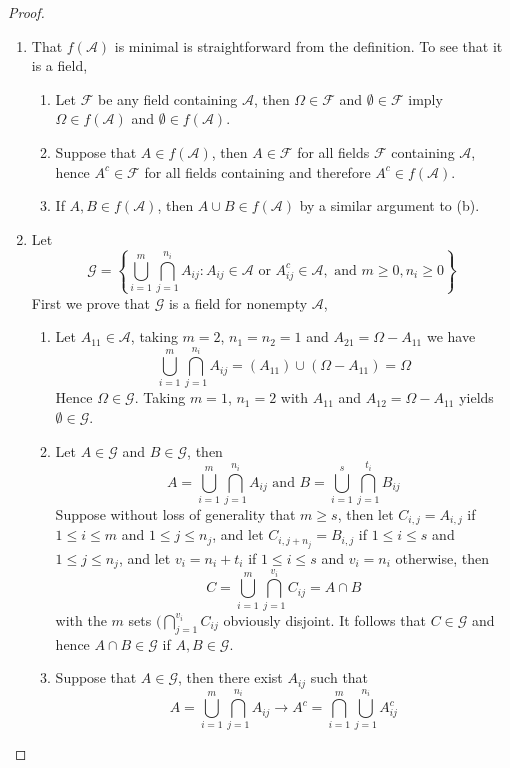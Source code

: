 \documentclass[12pt]{article}
\newcommand{\F}{\mathcal{F}}
\newcommand{\A}{\mathcal{A}}
\newcommand{\G}{\mathcal{G}}
\newcommand{\Om}{\Omega}
\newcommand{\es}{\emptyset}
\newcommand{\un}{\cup}
\newcommand{\ic}{\cap}
\begin{document}
\begin{proof}
    \begin{enumerate}
        \item That $f(\A)$ is minimal is straightforward from the definition. To see that it is a field,
        \begin{enumerate}
            \item Let $\F$ be any field containing $\A$, then $\Om \in \F$ and $\es \in \F$ imply $\Om \in f(\A)$ and $\es \in f(\A)$.
            \item Suppose that $A \in f(\A)$, then $A \in \F$ for all fields $\F$ containing $\A$, hence $A^{c} \in \F$ for all fields containing and therefore $A^{c} \in f(\A)$.
            \item If $A, B \in f(\A)$, then $A \un B \in f(\A)$ by a similar argument to (b).
        \end{enumerate}
        \item Let 
        \[ \G = \left \{ \bigcup_{i=1}^{m} \bigcap_{j=1}^{n_i} A_{ij} : A_{ij} \in \A \text { or } A_{ij}^{c} \in \A, \text { and } m \geq 0, n_i \geq 0 \right \} \]
        First we prove that $\G$ is a field for nonempty $\A$,
        \begin{enumerate}
            \item Let $A_{11} \in \A$, taking $m=2$, $n_1 = n_2 = 1$ and $A_{21} = \Om - A_{11}$ we have
            \[ \bigcup_{i=1}^{m} \bigcap_{j=1}^{n_i} A_{ij} = (A_{11}) \un (\Om - A_{11}) = \Om \]
            Hence $\Om \in \G$. Taking $m=1$, $n_1 = 2$ with $A_{11}$ and $A_{12} = \Om - A_{11}$ yields $\es \in \G$.
            \item Let $A \in \G$ and $B \in \G$, then
            \[ A = \bigcup_{i=1}^{m} \bigcap_{j=1}^{n_i} A_{ij} \text { and } B = \bigcup_{i=1}^{s} \bigcap_{j=1}^{t_i} B_{ij} \]
            Suppose without loss of generality that $m \geq s$, then let $C_{i,j} = A_{i,j}$ if $1 \leq i \leq m$ and $1 \leq j \leq n_j$, and let $C_{i, j+n_j} = B_{i, j}$ if $1 \leq i \leq s$ and $1 \leq j \leq n_j$, and let $v_i = n_i + t_i$ if $1 \leq i \leq s$ and $v_i = n_i$ otherwise, then 
            \[ C = \bigcup_{i=1}^{m} \bigcap_{j=1}^{v_i} C_{ij} = A \ic B \]
            with the $m$ sets $(\bigcap_{j=1}^{v_i} C_{ij}$ obviously disjoint. It follows that $C \in \G$ and hence $A \ic B \in \G$ if $A, B \in \G$.
            \item Suppose that $A \in \G$, then there exist $A_{ij}$ such that
            \[ A = \bigcup_{i=1}^{m} \bigcap_{j=1}^{n_i} A_{ij}  \longrightarrow A^{c} = \bigcap_{i=1}^{m} \bigcup_{j=1}^{n_i} A_{ij}^{c} \]

\end{enumerate}
\end{enumerate}
\end{proof}
\end{document}
